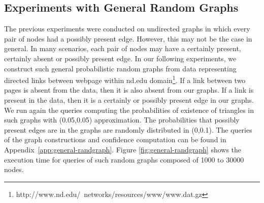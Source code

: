 \subsection{Experiments with General Random Graphs} 

The previous experiments were conducted on undirected graphs in which every pair of nodes had a possibly present edge. However, this may not be the case in general. In many scenarios, each pair of nodes may have a certainly present, certainly absent or possibly present edge. In our following experiments, we construct such general probabilistic random graphs from data representing directed links between webpage within nd.edu domain\footnote{http://www.nd.edu/~networks/resources/www/www.dat.gz}. If a link between two pages is absent from the data, then it is also absent from our graphs. If a link is present in the data, then it is a certainly or possibly present edge in our graphs. We run again the queries computing the probabilities of existence of triangles in such graphs with (0.05,0.05) approximation. The probabilities that possibly present edges are in the graphs are randomly distributed in (0,0.1). The queries of the graph constructions and confidence computation can be found in Appendix~\ref{app:general-randgraph}. Figure \ref{fig:general-randgraph} shows the execution time for queries of such random graphs composed of 1000 to 30000 nodes.

